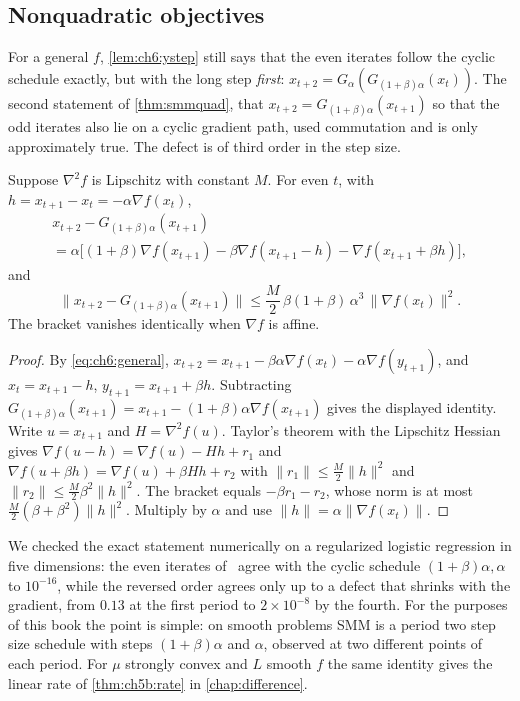 \subsection{Nonquadratic objectives}

For a general $f$, \cref{lem:ch6:ystep} still says that the even iterates follow
the cyclic schedule exactly, but with the long step \emph{first}:
$x_{t+2}=G_\alpha(G_{(1+\beta)\alpha}(x_t))$. The second statement of
\cref{thm:smmquad}, that $x_{t+2}=G_{(1+\beta)\alpha}(x_{t+1})$ so that the odd
iterates also lie on a cyclic gradient path, used commutation and is only
approximately true. The defect is of third order in the step size.

\begin{proposition}\label{prop:ch6:defect}
Suppose $\nabla^2f$ is Lipschitz with constant $M$. For even $t$, with
$h=x_{t+1}-x_t=-\alpha\nabla f(x_t)$,
\begin{multline*}
  x_{t+2}-G_{(1+\beta)\alpha}(x_{t+1})\\
  =\alpha\bigl[(1+\beta)\nabla f(x_{t+1})-\beta\nabla f(x_{t+1}-h)
   -\nabla f(x_{t+1}+\beta h)\bigr],
\end{multline*}
and
\[
  \bigl\|x_{t+2}-G_{(1+\beta)\alpha}(x_{t+1})\bigr\|
  \le\frac{M}{2}\,\beta(1+\beta)\,\alpha^3\,\|\nabla f(x_t)\|^2 .
\]
The bracket vanishes identically when $\nabla f$ is affine.
\end{proposition}

\begin{proof}
By \eqref{eq:ch6:general}, $x_{t+2}=x_{t+1}-\beta\alpha\nabla f(x_t)-\alpha\nabla
f(y_{t+1})$, and $x_t=x_{t+1}-h$, $y_{t+1}=x_{t+1}+\beta h$. Subtracting
$G_{(1+\beta)\alpha}(x_{t+1})=x_{t+1}-(1+\beta)\alpha\nabla f(x_{t+1})$ gives the
displayed identity. Write $u=x_{t+1}$ and $H=\nabla^2f(u)$. Taylor's theorem with
the Lipschitz Hessian gives $\nabla f(u-h)=\nabla f(u)-Hh+r_1$ and
$\nabla f(u+\beta h)=\nabla f(u)+\beta Hh+r_2$ with $\|r_1\|\le\tfrac M2\|h\|^2$
and $\|r_2\|\le\tfrac M2\beta^2\|h\|^2$. The bracket equals $-\beta r_1-r_2$, whose
norm is at most $\tfrac M2(\beta+\beta^2)\|h\|^2$. Multiply by $\alpha$ and use
$\|h\|=\alpha\|\nabla f(x_t)\|$.
\end{proof}

We checked the exact statement numerically on a regularized logistic regression
in five dimensions: the even iterates of \smmdet\ agree with the cyclic schedule
$(1+\beta)\alpha,\alpha$ to $10^{-16}$, while the reversed order agrees only up
to a defect that shrinks with the gradient, from $0.13$ at the first period to
$2\times10^{-8}$ by the fourth. For the purposes of this book the point is
simple: on smooth problems SMM is a period two step size schedule with steps
$(1+\beta)\alpha$ and $\alpha$, observed at two different points of each period.
For $\mu$ strongly convex and $L$ smooth $f$ the same identity gives the linear rate of \cref{thm:ch5b:rate} in \cref{chap:difference}.

